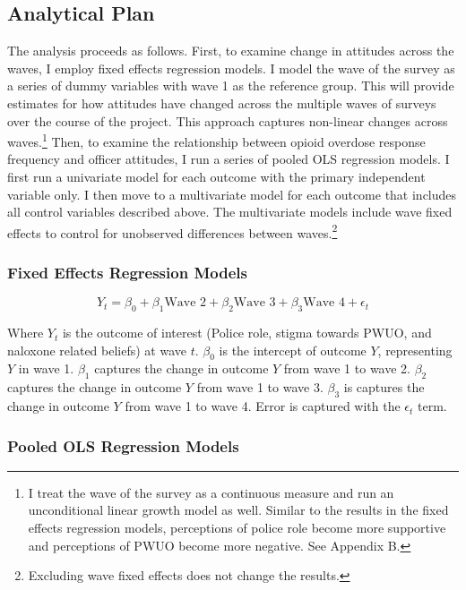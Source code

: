\subsection{Analytical Plan}

The analysis proceeds as follows. First, to examine change in attitudes across the waves, I employ fixed effects regression models. I model the wave of the survey as a series of dummy variables with wave 1 as the reference group. This will provide estimates for how attitudes have changed across the multiple waves of surveys over the course of the project. This approach captures non-linear changes across waves.\footnote{I treat the wave of the survey as a continuous measure and run an unconditional linear growth model as well. Similar to the results in the fixed effects regression models, perceptions of police role become more supportive and perceptions of PWUO become more negative. See Appendix B.} Then, to examine the relationship between opioid overdose response frequency and officer attitudes, I run a series of pooled OLS regression models. I first run a univariate model for each outcome with the primary independent variable only. I then move to a multivariate model for each outcome that includes all control variables described above. The multivariate models include wave fixed effects to control for unobserved differences between waves.\footnote{Excluding wave fixed effects does not change the results.} 

\subsubsection{Fixed Effects Regression Models}

\[Y_t = \beta_0 + \beta_1 \text{Wave 2} + \beta_2 \text{Wave 3} + \beta_3 \text{Wave 4} + \epsilon_t \]

Where \(Y_t\) is the outcome of interest (Police role, stigma towards PWUO, and naloxone related beliefs) at wave \(t\). \(\beta_0\) is the intercept of outcome \(Y\), representing \(Y\) in wave 1. \(\beta_1\) captures the change in outcome \(Y\) from wave 1 to wave 2. \(\beta_2\) captures the change in outcome \(Y\) from wave 1 to wave 3. \(\beta_3\) is captures the change in outcome \(Y\) from wave 1 to wave 4. Error is captured with the \(\epsilon_t\) term.

\subsubsection{Pooled OLS Regression Models}

